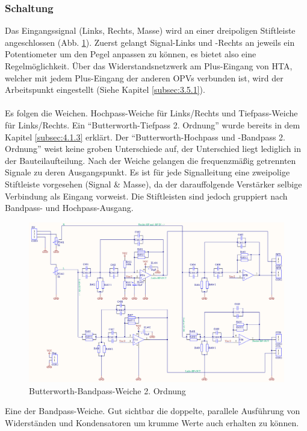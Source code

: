 \subsubsection{Schaltung}\label{subsec:4.3.2}
Das Eingangssignal (Links, Rechts, Masse) wird an einer dreipoligen Stiftleiste angeschlossen (Abb. \ref{fig:4.3.2.1}).
Zuerst gelangt Signal-Links und -Rechts an jeweils ein Potentiometer um den Pegel anpassen zu können, es bietet also eine Regelmöglichkeit.
Über das Widerstandsnetzwerk am Plus-Eingang von HTA, welcher mit jedem Plus-Eingang der anderen OPVs verbunden ist, wird der Arbeitspunkt eingestellt (Siehe Kapitel \ref{subsec:3.5.1}). 
\\ \\
Es folgen die Weichen.
Hochpass-Weiche für Links/Rechts und Tiefpass-Weiche für Links/Rechts.
Ein \enquote{Butterworth-Tiefpass 2. Ordnung} wurde bereits in dem Kapitel \ref{subsec:4.1.3} erklärt.
Der \enquote{Butterworth-Hochpass und -Bandpass 2. Ordnung} weist keine groben Unterschiede auf, der Unterschied liegt lediglich in der Bauteilaufteilung.
\newpage
Nach der Weiche gelangen die frequenzmäßig getrennten Signale zu deren Ausgangspunkt. Es ist für jede Signalleitung eine zweipolige Stiftleiste vorgesehen (Signal \& Masse), da der darauffolgende Verstärker selbige Verbindung als Eingang vorweist.
Die Stiftleisten sind jedoch gruppiert nach Bandpass- und Hochpass-Ausgang.
\begin{figure} [H]
	\centering	
	\includegraphics[width=1\textwidth]{img/Print4/4_TTuHTWeiche-Schematic.PNG}
	\caption{Butterworth-Bandpass-Weiche 2. Ordnung}
	\label {fig:4.3.2.1}
\end{figure}
Eine der Bandpass-Weiche.
Gut sichtbar die doppelte, parallele Ausführung von Widerständen und Kondensatoren um krumme Werte auch erhalten zu können.
